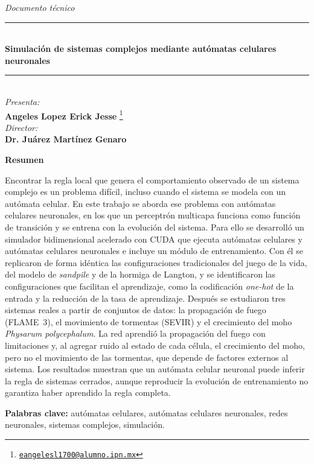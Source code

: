 \begin{center}
	
	{\fontsize{14}{17}\selectfont \textit{Documento técnico}}\\[0.2cm]
	
	\rule{0.6\textwidth}{0.4pt}\\[0.4cm]
	{\fontsize{16}{19}\selectfont \textbf{Simulación de sistemas complejos mediante autómatas celulares neuronales}}\\
	\rule{0.6\textwidth}{0.4pt}\\[0.5cm]
	
	{\fontsize{14}{17}\selectfont \textit{Presenta:}}\\[0.2cm]
	{\fontsize{14}{17}\selectfont \textbf{Angeles Lopez Erick Jesse}}%
	{\renewcommand{\thefootnote}{\fnsymbol{footnote}}%
	\footnote[1]{\href{mailto:eangelesl1700@alumno.ipn.mx}{\texttt{eangelesl1700@alumno.ipn.mx}}}}\\[0.4cm]
	
	{\fontsize{14}{17}\selectfont \textit{Director:}}\\[0.2cm]
	{\fontsize{14}{17}\selectfont \textbf{Dr. Juárez Martínez Genaro}}
	
\end{center}

{\centering \fontsize{14}{17}\selectfont \textbf{Resumen}\par}

\noindent Encontrar la regla local que genera el comportamiento observado de un sistema complejo es un problema difícil, incluso cuando el sistema se modela con un autómata celular. En este trabajo se aborda ese problema con autómatas celulares neuronales, en los que un perceptrón multicapa funciona como función de transición y se entrena con la evolución del sistema. Para ello se desarrolló un simulador bidimensional acelerado con CUDA que ejecuta autómatas celulares y autómatas celulares neuronales e incluye un módulo de entrenamiento. Con él se replicaron de forma idéntica las configuraciones tradicionales del juego de la vida, del modelo de \textit{sandpile} y de la hormiga de Langton, y se identificaron las configuraciones que facilitan el aprendizaje, como la codificación \textit{one-hot} de la entrada y la reducción de la tasa de aprendizaje. Después se estudiaron tres sistemas reales a partir de conjuntos de datos: la propagación de fuego (FLAME~3), el movimiento de tormentas (SEVIR) y el crecimiento del moho \textit{Physarum polycephalum}. La red aprendió la propagación del fuego con limitaciones y, al agregar ruido al estado de cada célula, el crecimiento del moho, pero no el movimiento de las tormentas, que depende de factores externos al sistema. Los resultados muestran que un autómata celular neuronal puede inferir la regla de sistemas cerrados, aunque reproducir la evolución de entrenamiento no garantiza haber aprendido la regla completa.

\noindent\textbf{Palabras clave:} autómatas celulares, autómatas celulares neuronales, redes neuronales, sistemas complejos, simulación.

\restoregeometry
\onehalfspacing
